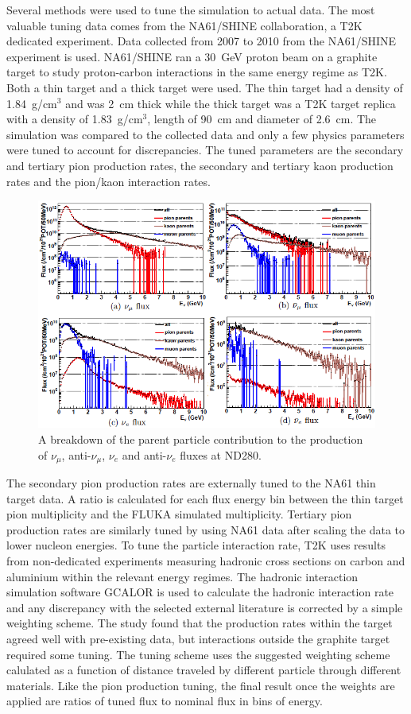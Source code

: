 Several methods were used to tune the simulation to actual data. The most valuable tuning data comes from the NA61/SHINE collaboration, a T2K dedicated experiment. Data collected from 2007 to 2010 from the NA61/SHINE experiment is used. NA61/SHINE ran a 30~GeV proton beam on a graphite target to study proton-carbon interactions in the same energy regime as T2K. Both a thin target and a thick target were used. The thin target had a density of 1.84~g/cm$^3$ and was 2~cm thick while the thick target was a T2K target replica with a density of  1.83~g/cm$^3$, length of 90~cm and diameter of 2.6~cm. The simulation was compared to the collected data and only a few physics parameters were tuned to account for discrepancies. The tuned parameters are the 
secondary and tertiary pion production rates, the secondary and tertiary kaon production rates and the pion/kaon interaction rates.

\begin{figure}[h]
\centering
\includegraphics[width=6in]{Figures/flux/fluxparent.PNG}
\caption{A breakdown of the parent particle contribution to the production of $\nu_\mu$, anti-$\nu_\mu$, $\nu_e$ and anti-$\nu_e$ fluxes at ND280.} 
\label{fig:fluxparent}
\end{figure}

The secondary pion production rates are externally tuned to the NA61 thin target data. A ratio is calculated for each flux energy bin between the thin target pion multiplicity and the FLUKA simulated multiplicity. Tertiary pion production rates are similarly tuned by using NA61 data after scaling the data to lower nucleon energies. To tune the particle interaction rate, T2K uses results from non-dedicated experiments measuring hadronic cross sections on carbon and aluminium within the relevant energy regimes. The hadronic interaction simulation software GCALOR is used to calculate the hadronic interaction rate and any discrepancy with the selected external literature is corrected by a simple weighting scheme. The study found that the production rates within the target agreed well with pre-existing data, but interactions outside the graphite target required some tuning. The tuning scheme uses the suggested weighting scheme calulated as a function of distance traveled by different particle through different materials. Like the pion production tuning, the final result once the weights are applied are ratios of tuned flux to nominal flux in bins of energy. 

